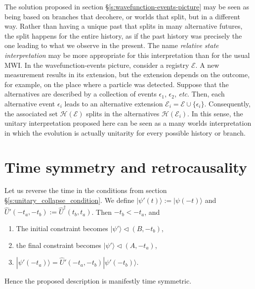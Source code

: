 \documentclass[12pt]{amsart}
\theoremstyle{definition}
\theoremstyle{plain}
\begin{document}
The solution proposed in section \S\ref{s:wavefunction-events-picture} may be seen as being based on branches that decohere, or worlds that split, but in a different way. Rather than having a unique past that splits in many alternative futures, the split happens for the entire history, as if the past history was precisely the one leading to what we observe in the present. The name \emph{relative state interpretation} may be more appropriate for this interpretation than for the usual MWI. In the wavefunction-events picture, consider a registry $\mathcal E$. A new measurement results in its extension, but the extension depends on the outcome, for example, on the place where a particle was detected. Suppose that the alternatives are described by a collection of events $\epsilon_1$, $\epsilon_2$, \textit{etc}. Then, each alternative event $\epsilon_i$ leads to an alternative extension $\mathcal E_i=\mathcal E\cup\{\epsilon_i\}$. Consequently, the associated set $\mathscr{H}(\mathcal E)$ splits in the alternatives $\mathscr{H}(\mathcal E_i)$. In this sense, the unitary interpretation proposed here can be seen as a many worlds interpretation in which the evolution is actually unitarity for every possible history or branch. 


\section{Time symmetry and retrocausality}
\label{s:time_symmetry}

Let us reverse the time in the conditions from section \S\ref{s:unitary_collapse_condition}. We define $|{\psi'(t)}\rangle:=|{\psi(-t)}\rangle$ and $\hat U'(-t_a,-t_b) := \hat U^\dagger(t_b,t_a)$. Then $-t_b < -t_a$, and

\begin{enumerate}
	\item 
The initial constraint becomes
$|{\psi'}\rangle\triangleleft(B,-t_b)$,
	\item 
the final constraint becomes
$|{\psi'}\rangle\triangleleft(A,-t_a)$,
	\item 
$|{\psi'(-t_a)}\rangle=\hat U'(-t_a,-t_b)|{\psi'(-t_b)}\rangle$.
\end{enumerate}

Hence the proposed description is manifestly time symmetric.
\end{document}

